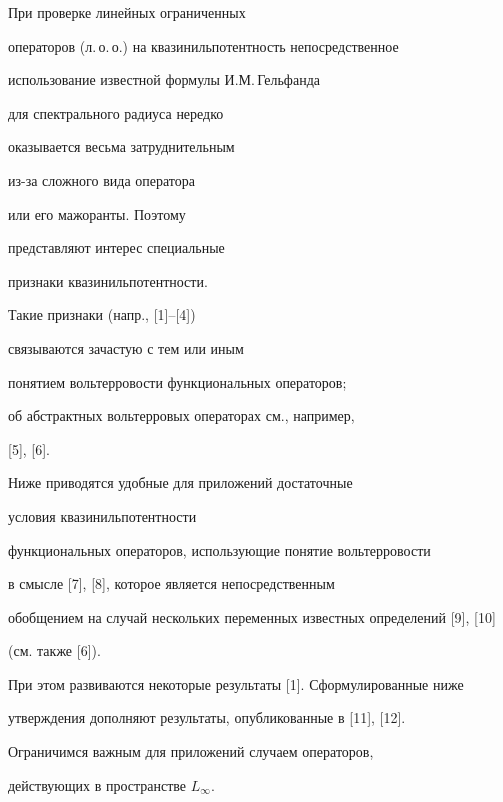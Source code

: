 

\maketitle


\label{begin}





При проверке линейных ограниченных


операторов (л.\,о.\,о.) на квазинильпотентность непосредственное


использование известной формулы И.М.\,Гельфанда


для спектрального радиуса нередко


оказывается весьма затруднительным


из-за сложного вида оператора


или его мажоранты. Поэтому


представляют интерес специальные


признаки квазинильпотентности.


Такие признаки (напр., [1]--[4])


связываются зачастую с тем или иным


понятием вольтерровости функциональных операторов;


об абстрактных вольтерровых операторах см., например,


[5], [6].


Ниже приводятся удобные для приложений достаточные


условия квазинильпотентности


функциональных операторов, использующие понятие вольтерровости


в смысле [7], [8], которое является непосредственным


обобщением на случай нескольких переменных известных определений [9], [10]


(см. также [6]).


При этом развиваются некоторые результаты [1]. Сформулированные ниже


утверждения дополняют результаты, опубликованные в [11], [12].








Ограничимся важным для приложений случаем операторов, 


действующих в пространстве $L_\infty$.


